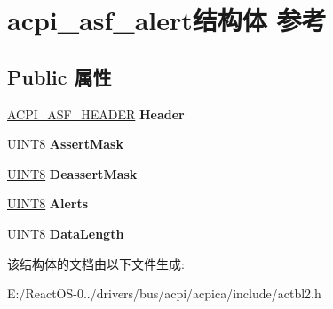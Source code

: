 \hypertarget{structacpi__asf__alert}{}\section{acpi\+\_\+asf\+\_\+alert结构体 参考}
\label{structacpi__asf__alert}
\subsection*{Public 属性}
\begin{DoxyCompactItemize}
\item 
\mbox{\label{structacpi__asf__alert_ab2a54556e8272d139608897247265177}} 
\hyperlink{structacpi__asf__header}{A\+C\+P\+I\+\_\+\+A\+S\+F\+\_\+\+H\+E\+A\+D\+ER} {\bfseries Header}
\item 
\mbox{\label{structacpi__asf__alert_a6e5f81514490607dd4c5e8f9df2c437e}} 
\hyperlink{_processor_bind_8h_ab27e9918b538ce9d8ca692479b375b6a}{U\+I\+N\+T8} {\bfseries Assert\+Mask}
\item 
\mbox{\label{structacpi__asf__alert_ac917b1752d301ef2cd52fabffa6bac28}} 
\hyperlink{_processor_bind_8h_ab27e9918b538ce9d8ca692479b375b6a}{U\+I\+N\+T8} {\bfseries Deassert\+Mask}
\item 
\mbox{\label{structacpi__asf__alert_a5adfe1990a5282d1a58cc0386dc2eea4}} 
\hyperlink{_processor_bind_8h_ab27e9918b538ce9d8ca692479b375b6a}{U\+I\+N\+T8} {\bfseries Alerts}
\item 
\mbox{\label{structacpi__asf__alert_a98757af8d82d08bef89ed9cb84903aab}} 
\hyperlink{_processor_bind_8h_ab27e9918b538ce9d8ca692479b375b6a}{U\+I\+N\+T8} {\bfseries Data\+Length}
\end{DoxyCompactItemize}


该结构体的文档由以下文件生成\+:\begin{DoxyCompactItemize}
\item 
E\+:/\+React\+O\+S-\/0../drivers/bus/acpi/acpica/include/actbl2.\+h\end{DoxyCompactItemize}
